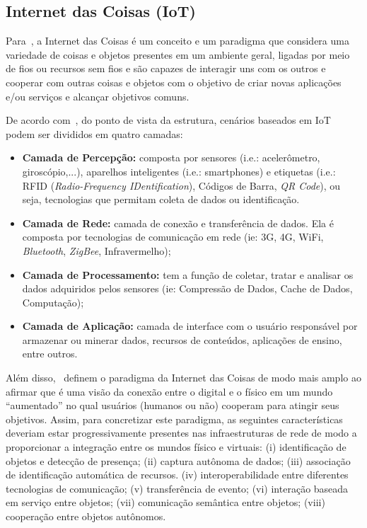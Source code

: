 \subsection{Internet das Coisas (IoT)}\label{section:iot}

Para~\cite{Vermesan:2013}, a Internet das Coisas é um conceito e um paradigma que considera uma variedade de coisas e objetos presentes em um ambiente geral, ligadas por meio de fios ou recursos sem fios e são capazes de interagir uns com os outros e cooperar com outras coisas e objetos com o objetivo de criar novas aplicações e/ou serviços e alcançar objetivos comuns.

De acordo com~\cite{Chang:2014}, do ponto de vista da estrutura, cenários baseados em IoT podem ser divididos em quatro camadas:

\begin{itemize}
	\item \textbf{Camada de Percepção:} composta por sensores (i.e.: acelerômetro, giroscópio,...), aparelhos inteligentes (i.e.: smartphones) e etiquetas (i.e.: RFID (\textit{Radio-Frequency IDentification}), Códigos de Barra, \textit{QR Code}), ou seja, tecnologias que permitam coleta de dados ou identificação.
	\item \textbf{Camada de Rede:} camada de conexão e transferência de dados. Ela é composta por tecnologias de comunicação em rede (ie: 3G, 4G, WiFi, \textit{Bluetooth}, \textit{ZigBee}, Infravermelho);
	\item \textbf{Camada de Processamento:} tem a função de coletar, tratar e analisar os dados adquiridos pelos sensores (ie: Compressão de Dados, Cache de Dados, Computação);
	\item \textbf{Camada de Aplicação:} camada de interface com o usuário responsável por armazenar ou minerar dados, recursos de conteúdos, aplicações de ensino, entre outros.
\end{itemize}

Além disso,~\cite{serbanati:2011} definem o paradigma da Internet das Coisas de modo mais amplo ao afirmar que é uma visão da conexão entre o digital e o físico em um mundo ``aumentado'' no qual usuários (humanos ou não) cooperam para atingir seus objetivos. Assim, para concretizar este paradigma, as seguintes características deveriam estar progressivamente presentes nas infraestruturas de rede de modo a proporcionar a integração entre os mundos físico e virtuais: (i) identificação de objetos e detecção de presença; (ii) captura autônoma de dados; (iii) associação de identificação automática de recursos. (iv) interoperabilidade entre diferentes tecnologias de comunicação; (v) transferência de evento; (vi) interação baseada em serviço entre objetos; (vii) comunicação semântica entre objetos; (viii) cooperação entre objetos autônomos.

